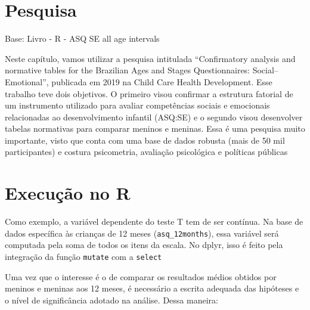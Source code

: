 \documentclass[
]{book}
\newenvironment{Shaded}{\begin{snugshade}}{\end{snugshade}}
\newcommand{\DataTypeTok}[1]{\textcolor[rgb]{0.13,0.29,0.53}{#1}}
\newcommand{\KeywordTok}[1]{\textcolor[rgb]{0.13,0.29,0.53}{\textbf{#1}}}
\newcommand{\NormalTok}[1]{#1}
\newcommand{\OperatorTok}[1]{\textcolor[rgb]{0.81,0.36,0.00}{\textbf{#1}}}
\newcommand{\OtherTok}[1]{\textcolor[rgb]{0.56,0.35,0.01}{#1}}
\newcommand{\StringTok}[1]{\textcolor[rgb]{0.31,0.60,0.02}{#1}}
\begin{document}
\hypertarget{pesquisa-1}{%
\section{Pesquisa}\label{pesquisa-1}}

\begin{alert}

Base: Livro - R - ASQ SE all age intervals

\end{alert}

Neste capítulo, vamos utilizar a pesquisa intitulada ``Confirmatory analysis and normative tables for the Brazilian Ages and Stages Questionnaires: Social--Emotional'', publicada em 2019 na Child Care Health Development. Esse trabalho teve dois objetivos. O primeiro visou confirmar a estrutura fatorial de um instrumento utilizado para avaliar competências sociais e emocionais relacionadas ao desenvolvimento infantil (ASQ:SE) e o segundo visou desenvolver tabelas normativas para comparar meninos e meninas. Essa é uma pesquisa muito importante, visto que conta com uma base de dados robusta (mais de 50 mil participantes) e costura psicometria, avaliação psicológica e políticas públicas

\hypertarget{execuuxe7uxe3o-no-r}{%
\section{Execução no R}\label{execuuxe7uxe3o-no-r}}

Como exemplo, a variável dependente do teste T tem de ser contínua. Na base de dados específica às crianças de 12 meses (\texttt{asq\_12months}), essa variável será computada pela soma de todos os itens da escala. No dplyr, isso é feito pela integração da função \texttt{mutate} com a \texttt{select}

\begin{Shaded}
\end{Shaded}

Uma vez que o interesse é o de comparar os resultados médios obtidos por meninos e meninas aos 12 meses, é necessário a escrita adequada das hipóteses e o nível de significância adotado na análise. Dessa maneira:
\end{document}
